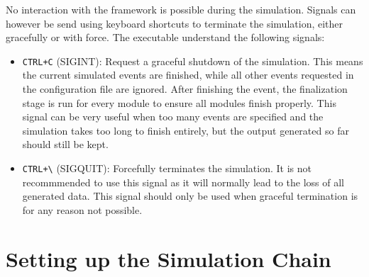 No interaction with the framework is possible during the simulation. Signals can however be send using keyboard shortcuts to terminate the simulation, either gracefully or with force. The executable understand the following signals:
\begin{itemize}
\item \texttt{CTRL+C} (SIGINT): Request a graceful shutdown of the simulation. This means the current simulated events are finished, while all other events requested in the configuration file are ignored. After finishing the event, the finalization stage is run for every module to ensure all modules finish properly. This signal can be very useful when too many events are specified and the simulation takes too long to finish entirely, but the output generated so far should still be kept.
\item \texttt{CTRL+\textbackslash} (SIGQUIT): Forcefully terminates the simulation. It is not recommmended to use this signal as it will normally lead to the loss of all generated data. This signal should only be used when graceful termination is for any reason not possible.
\end{itemize}


\section{Setting up the Simulation Chain}
\label{sec:setting_up_simulation_chain}

